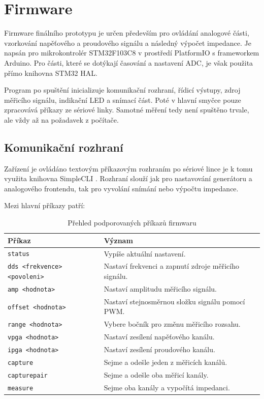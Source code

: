 \chapter{Firmware}

Firmware finálního prototypu je určen především pro ovládání analogové části, vzorkování napěťového a proudového signálu a následný výpočet impedance. 
Je napsán pro mikrokontrolér STM32F103C8 v prostředí PlatformIO s frameworkem Arduino. 
Pro části, které se dotýkají časování a nastavení ADC, je však použita přímo knihovna STM32 HAL. \cite{STM32_manual}

Program po spuštění inicializuje komunikační rozhraní, řídicí výstupy, zdroj měřicího signálu, indikační LED a snímací část. 
Poté  v hlavní smyčce pouze zpracovává příkazy ze sériové linky. 
Samotné měření tedy není spuštěno trvale, ale vždy až na požadavek z počítače.

\section{Komunikační rozhraní}

Zařízení je ovládáno textovým příkazovým rozhraním po sériové lince je k tomu využita knihovna SimpleCLI \cite{SimpleCLI}. 
Rozhraní slouží jak pro nastavování generátoru a analogového frontendu, tak pro vyvolání snímání nebo výpočtu impedance.

Mezi hlavní příkazy patří:
\begin{table}[H]
    \centering
    \small
    \begin{tabular}{ll}
        \toprule
        Příkaz & Význam \\
        \midrule
        \texttt{status} & Vypíše aktuální nastavení. \\
        \texttt{dds <frekvence> <povoleni>} & Nastaví frekvenci a zapnutí zdroje měřicího signálu. \\
        \texttt{amp <hodnota>} & Nastaví amplitudu měřicího signálu. \\
        \texttt{offset <hodnota>} & Nastaví stejnosměrnou složku signálu pomocí PWM. \\
        \texttt{range <hodnota>} & Vybere bočník pro změnu měřicího rozsahu. \\
        \texttt{vpga <hodnota>} & Nastaví zesílení napěťového kanálu. \\
        \texttt{ipga <hodnota>} & Nastaví zesílení proudového kanálu. \\
        \texttt{capture} & Sejme a odešle jeden z měřicích kanálů. \\
        \texttt{capturepair} & Sejme a odešle oba měřicí kanály. \\
        \texttt{measure} & Sejme oba kanály a vypočítá impedanci. \\
        \bottomrule
    \end{tabular}
    \caption{Přehled podporovaných příkazů firmwaru}
    \label{tab:firmware_prikazy}
\end{table}

